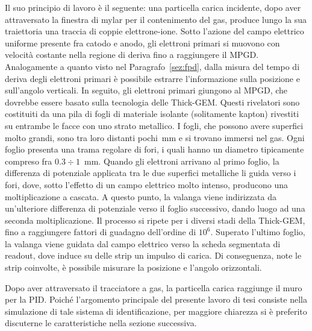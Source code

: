 Il suo principio di lavoro è il seguente: una particella carica incidente, dopo aver attraversato la finestra di mylar per il contenimento del gas, produce lungo la sua traiettoria una traccia di coppie elettrone-ione. 
Sotto l'azione del campo elettrico uniforme presente fra catodo e anodo, gli elettroni primari si muovono con velocità costante nella regione di deriva fino a raggiungere il MPGD.
Analogamente a quanto visto nel Paragrafo~\ref{sez:fpd}, dalla misura del tempo di deriva degli elettroni primari è possibile estrarre l'informazione sulla posizione e sull'angolo verticali.
In seguito, gli elettroni primari giungono al MPGD, che dovrebbe essere basato sulla tecnologia delle Thick-GEM.
Questi rivelatori sono costituiti da una pila di fogli di materiale isolante (solitamente kapton) rivestiti su entrambe le facce con uno strato metallico.
I fogli, che possono avere superfici molto grandi, sono tra loro distanti pochi~mm e si trovano immersi nel gas.
Ogni foglio presenta una trama regolare di fori, i quali hanno un diametro tipicamente compreso fra $ 0.3 \div 1$~mm.
Quando gli elettroni arrivano al primo foglio, la differenza di potenziale applicata tra le due superfici metalliche li guida verso i fori, dove, sotto l'effetto di un campo elettrico molto intenso, producono una moltiplicazione a cascata.
A questo punto, la valanga viene indirizzata da un'ulteriore differenza di potenziale verso il foglio successivo, dando luogo ad una seconda moltiplicazione.
Il processo si ripete per i diversi stadi della Thick-GEM, fino a raggiungere fattori di guadagno dell'ordine di $10^6$. 
Superato l'ultimo foglio, la valanga viene guidata dal campo elettrico verso la scheda segmentata di readout, dove induce su delle strip un impulso di carica. 
Di conseguenza, note le strip coinvolte, è possibile misurare la posizione e l'angolo orizzontali. 





Dopo aver attraversato il tracciatore a gas, la particella carica raggiunge il muro per la PID.
Poiché l'argomento principale del presente lavoro di tesi consiste nella simulazione di tale sistema di identificazione, per maggiore chiarezza si è preferito discuterne le caratteristiche nella sezione successiva.

